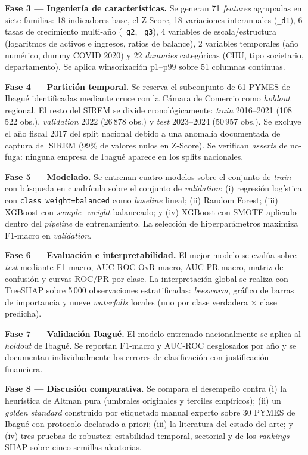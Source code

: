 \documentclass[12pt, letterpaper]{article}
\newcommand{\zaltscore}{Z\textquotesingle\textquotesingle-Score}
\begin{document}
\textbf{Fase 3 --- Ingenier\'ia de caracter\'isticas.} Se generan 71 \textit{features} agrupadas en siete familias: 18 indicadores base, el \zaltscore{}, 18 variaciones interanuales (\texttt{\_d1}), 6 tasas de crecimiento multi-a\~no (\texttt{\_g2}, \texttt{\_g3}), 4 variables de escala/estructura (logaritmos de activos e ingresos, ratios de balance), 2 variables temporales (a\~no num\'erico, dummy COVID 2020) y 22 \textit{dummies} categ\'oricas (CIIU, tipo societario, departamento). Se aplica winsorizaci\'on p1--p99 sobre 51 columnas continuas.

\textbf{Fase 4 --- Partici\'on temporal.} Se reserva el subconjunto de 61 PYMES de Ibagu\'e identificadas mediante cruce con la C\'amara de Comercio como \textit{holdout} regional. El resto del SIREM se divide cronol\'ogicamente: \textit{train} 2016--2021 (108\,522 obs.), \textit{validation} 2022 (26\,878 obs.) y \textit{test} 2023--2024 (50\,957 obs.). Se excluye el a\~no fiscal 2017 del split nacional debido a una anomal\'ia documentada de captura del SIREM (99\% de valores nulos en Z-Score). Se verifican \textit{asserts} de no-fuga: ninguna empresa de Ibagu\'e aparece en los splits nacionales.

\textbf{Fase 5 --- Modelado.} Se entrenan cuatro modelos sobre el conjunto de \textit{train} con b\'usqueda en cuadr\'icula sobre el conjunto de \textit{validation}: (i) regresi\'on log\'istica con \texttt{class\_weight=balanced} como \textit{baseline} lineal; (ii) Random Forest; (iii) XGBoost con \textit{sample\_weight} balanceado; y (iv) XGBoost con SMOTE aplicado dentro del \textit{pipeline} de entrenamiento. La selecci\'on de hiperpar\'ametros maximiza F1-macro en \textit{validation}.

\textbf{Fase 6 --- Evaluaci\'on e interpretabilidad.} El mejor modelo se eval\'ua sobre \textit{test} mediante F1-macro, AUC-ROC OvR macro, AUC-PR macro, matriz de confusi\'on y curvas ROC/PR por clase. La interpretaci\'on global se realiza con TreeSHAP \citep{LundbergTreeSHAP2020} sobre 5\,000 observaciones estratificadas: \textit{beeswarm}, gr\'afico de barras de importancia y nueve \textit{waterfalls} locales (uno por clase verdadera × clase predicha).

\textbf{Fase 7 --- Validaci\'on Ibagu\'e.} El modelo entrenado nacionalmente se aplica al \textit{holdout} de Ibagu\'e. Se reportan F1-macro y AUC-ROC desglosados por a\~no y se documentan individualmente los errores de clasificaci\'on con justificaci\'on financiera.

\textbf{Fase 8 --- Discusi\'on comparativa.} Se compara el desempe\~no contra (i) la heur\'istica de Altman pura (umbrales originales y terciles emp\'iricos); (ii) un \textit{golden standard} construido por etiquetado manual experto sobre 30 PYMES de Ibagu\'e con protocolo declarado a-priori; (iii) la literatura del estado del arte; y (iv) tres pruebas de robustez: estabilidad temporal, sectorial y de los \textit{rankings} SHAP sobre cinco semillas aleatorias.
\end{document}
